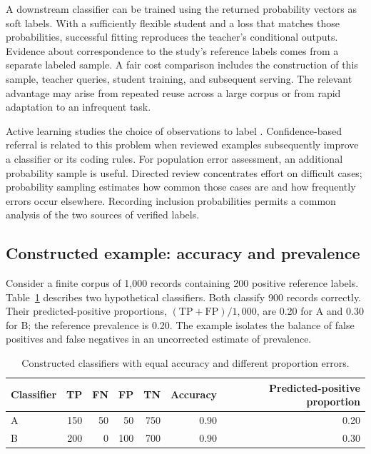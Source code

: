 \documentclass[11pt,a4paper]{article}
\begin{document}
A downstream classifier can be trained using the returned probability vectors as soft labels. With a sufficiently flexible student and a loss that matches those probabilities, successful fitting reproduces the teacher's conditional outputs. Evidence about correspondence to the study's reference labels comes from a separate labeled sample. A fair cost comparison includes the construction of this sample, teacher queries, student training, and subsequent serving. The relevant advantage may arise from repeated reuse across a large corpus or from rapid adaptation to an infrequent task.

Active learning studies the choice of observations to label \citep{settles2009}. Confidence-based referral is related to this problem when reviewed examples subsequently improve a classifier or its coding rules. For population error assessment, an additional probability sample is useful. Directed review concentrates effort on difficult cases; probability sampling estimates how common those cases are and how frequently errors occur elsewhere. Recording inclusion probabilities permits a common analysis of the two sources of verified labels.

\subsection{Constructed example: accuracy and prevalence}

Consider a finite corpus of 1,000 records containing 200 positive reference labels. Table~\ref{tab:confusion} describes two hypothetical classifiers. Both classify 900 records correctly. Their predicted-positive proportions, $(\mathrm{TP}+\mathrm{FP})/1{,}000$, are 0.20 for A and 0.30 for B; the reference prevalence is 0.20. The example isolates the balance of false positives and false negatives in an uncorrected estimate of prevalence.

\begin{table}[!htbp]
\centering\small
\caption{Constructed classifiers with equal accuracy and different proportion errors.}\label{tab:confusion}
\begin{tabular}{@{}lrrrrrr@{}}
\toprule
Classifier & TP & FN & FP & TN & Accuracy & Predicted-positive proportion \\
\midrule
A & 150 & 50 & 50 & 750 & 0.90 & 0.20 \\
B & 200 & 0 & 100 & 700 & 0.90 & 0.30 \\
\bottomrule
\end{tabular}
\end{table}
\end{document}
